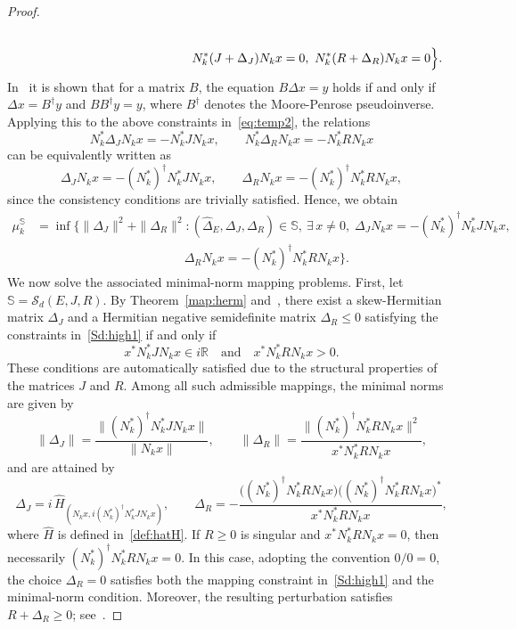 \documentclass[11pt]{article}
\begin{document}
\begin{proof}
\begin{eqnarray}
        \\ && \hspace{4.5cm} N_k^* (J+\Delta_J) N_k x = 0,~ N_k^* (R+\Delta_R) N_k x = 0 \Big\}.
    \end{eqnarray}
    In~\cite[Lemma 2.8]{MehMS16} it is shown that for a matrix $B$, the equation $B\Delta x = y$ holds if and only if $\Delta x = B^{\dagger}y$ and $BB^{\dagger}y = y$, where $B^{\dagger}$ denotes the Moore-Penrose pseudoinverse. Applying this to the above constraints in~\eqref{eq:temp2}, the relations
    \[
    N_k^* \Delta_J N_k x = - N_k^* J N_k x, \qquad N_k^* \Delta_R N_k x = - N_k^* R N_k x
    \]
    can be equivalently written as
    \[
    \Delta_J N_k x = - (N_k^*)^{\dagger} N_k^* J N_k x, \qquad \Delta_R N_k x = - (N_k^*)^{\dagger} N_k^* R N_k x,
    \]
    since the consistency conditions are trivially satisfied. Hence, we obtain
    \begin{eqnarray}\label{Sd:high1}
        \mu_k^{\mathbb S} &=  \inf\Big\{  \|\Delta_J\|^2 + \|\Delta_R\|^2 : (\hat \Delta_E,\Delta_J,\Delta_R)\in \mathbb S,~\exists\, x\neq 0, \; \Delta_J N_k x = - (N_k^*)^{\dagger} N_k^* J N_k x, \;
        \nonumber \\ &\hspace {5cm}\Delta_R N_k x = - (N_k^*)^{\dagger} N_k^* R N_k x \Big\}.
    \end{eqnarray}
    We now solve the associated minimal-norm mapping problems.
    First, let $\mathbb S=\mathcal S_d(E,J,R)$. By Theorem~\ref{map:herm} and~\cite[Theorem~2.3]{MehMS16}, there exist a skew-Hermitian matrix $\Delta_J$ and a Hermitian negative semidefinite matrix $\Delta_R\le 0$ satisfying the constraints in~\eqref{Sd:high1} if and only if
    \[
    x^* N_k^* J N_k x \in i\mathbb{R}
    \quad \text{and} \quad
    x^* N_k^* R N_k x > 0.
    \]
    These conditions are automatically satisfied due to the structural properties of the matrices $J$ and $R$.
    Among all such admissible mappings, the minimal norms are given by
    \[
    \|\Delta_J\| = \frac{\|(N_k^*)^{\dagger} N_k^* J N_k x\|}{\|N_k x\|}, \qquad
    \|\Delta_R\| = \frac{\|(N_k^*)^{\dagger} N_k^* R N_k x\|^2}{x^* N_k^* R N_k x},
    \]
    and are attained by
    \[
    \Delta_J = i\,\hat H_{(N_k x,i(N_k^*)^{\dagger} N_k^* J N_k x)}, \qquad
    \Delta_R = -\frac{\big((N_k^*)^{\dagger} N_k^* R N_k x\big) \big((N_k^*)^{\dagger} N_k^* R N_k x\big)^*}{x^* N_k^* R N_k x},
    \]
    where $\hat H$ is defined in~\eqref{def:hatH}.
    If $R\ge 0$ is singular and $x^* N_k^* R N_k x = 0$, then necessarily $(N_k^*)^{\dagger} N_k^* R N_k x = 0$. In this case, adopting the convention $0/0 = 0$, the choice $\Delta_R = 0$ satisfies both the mapping constraint in~\eqref{Sd:high1} and the minimal-norm condition. Moreover, the resulting perturbation satisfies $R + \Delta_R \ge 0$; see~\cite[Lemma~4.1]{MehMS16}.

\end{proof}
\end{document}
